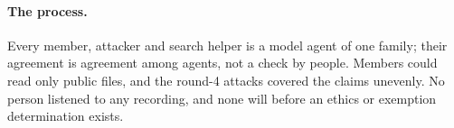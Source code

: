 \paragraph{The process.} Every member, attacker and search helper is a model agent of one family; their agreement is
agreement among agents, not a check by people. Members could read only public files, and the round-4 attacks covered
the claims unevenly. No person listened to any recording, and none will before an ethics or exemption determination
exists.
